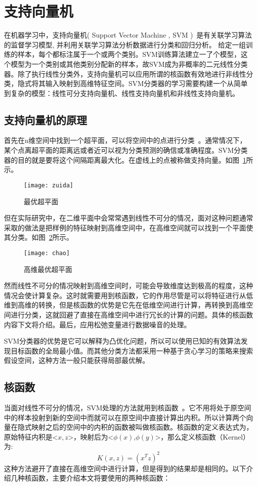 \section{支持向量机}
\label{sec:svm}
在机器学习中，支持向量机( Support Vector Machine , SVM )~\cite{cortes1995support}是有关联学习算法的监督学习模型, 并利用关联学习算法分析数据进行分类和回归分析。 给定一组训练的样本，每个都标注属于一个或两个类别。SVM训练算法建立一了个模型，这个模型为一个类别或其他类别分配新的样本，故SVM成为非概率的二元线性分类器。除了执行线性分类外，支持向量机可以应用所谓的核函数有效地进行非线性分类，隐式将其输入映射到高维特征空间。SVM分类器的学习需要构建一个从简单到复杂的模型：线性可分支持向量机、线性支持向量机和非线性支持向量机。
\subsection{支持向量机的原理}
\label{subsec:svmyuanli}
首先在n维空间中找到一个超平面，可以将空间中的点进行分类~\cite{boser1992training}。通常情况下，某个点离超平面的距离远或者近可以视为分类预测的确信或准确程度。SVM分类器的目的就是要将这个间隔距离最大化。在虚线上的点被称做支持向量。如图~\ref{fig:bowpingmian}所示。
\begin{figure}[H] %
  \centering
  \texttt{[image: zuida]}
  \caption{最优超平面\cite{cortes1995support}}
  \label{fig:bowpingmian}
\end{figure}
但在实际研究中，在二维平面中会常常遇到线性不可分的情况，面对这种问题通常采取的做法是把样例的特征映射到高维空间中，在高维空间就可以找到一个平面使其分类。如图~\ref{fig:pingmian}所示。
\begin{figure}[H] %
  \centering
  \texttt{[image: chao]}
  \caption{高维最优超平面}
  \label{fig:pingmian}
\end{figure}
然而线性不可分的情况映射到高维空间时，可能会导致维度达到极高的程度，这种情况会使计算复杂。这时就需要用到核函数，它的作用尽管是可以将特征进行从低维到高维的转换，但是核函数的优势是它先在低维空间进行计算，再转换到高维空间进行分类，这就回避了直接在高维空间中进行冗长的计算的问题。具体的核函数内容下文将介绍。最后，应用松弛变量进行数据噪音的处理。

SVM分类器的优势是它可以解释为凸优化问题，所以可以使用已知的有效算法发现目标函数的全局最小值。而其他分类方法都采用一种基于贪心学习的策略来搜索假设空间，这种方法一般只能获得局部最优解。
\subsection{核函数}
\label{subsec:kernel}
当面对线性不可分的情况，SVM处理的方法就用到核函数~\cite{bergman1970kernel}。它不用将处于原空间中的样本投射到新的空间中而就可以在原空间中直接计算出内积。所以计算两个向量在隐式映射之后的空间中的内积的函数被叫做核函数。核函数的定义表达式为，原始特征内积是<$x,z$>，映射后为<$\phi(x)$,$\phi(y)$>，那么定义核函数（Kernel）为:
\begin{equation}
K(x,z) = (x^{T}z)^{2}
\end{equation}
这种方法避开了直接在高维空间中进行计算，但是得到的结果却是相同的。以下介绍几种核函数，主要介绍本文将要使用的两种核函数：

